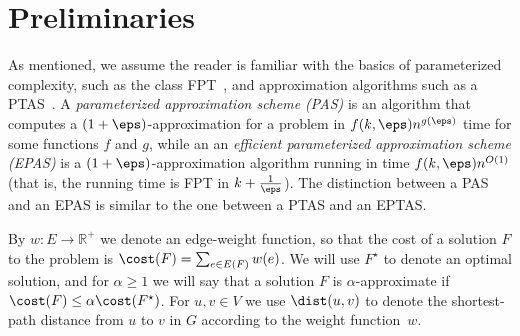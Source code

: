 \section{Preliminaries}\label{sec:prelims}

As mentioned, we assume the reader is familiar with the basics of parameterized
complexity, such as the class FPT~\cite{cygan2015parameterized}, and approximation algorithms
such as a PTAS~\cite{williamson2011design}. A
\emph{parameterized approximation scheme (PAS)} is an algorithm that computes a
$(1+\eps)$-approximation for a problem in  $f(k,\eps)n^{g(\eps)}$ time for some
functions $f$ and $g$, while an an \emph{efficient parameterized approximation
scheme (EPAS)} is a $(1+\eps)$-approximation algorithm running in time
$f(k,\eps)n^{O(1)}$ (that is, the running time is FPT in $k+\frac{1}{\eps}$).
The distinction between a PAS and an EPAS is similar to the one between a PTAS
and an EPTAS.

By $w:E\to\mathbb{R}^+$ we denote an edge-weight function, so that the cost of a solution $F$
to the \SF problem is $\cost(F)=\sum_{e\in E(F)} w(e)$. 
We will use $F^\star$ to denote an optimal solution, and for
$\alpha\ge 1$ we will say that a solution $F$ is $\alpha$-approximate if
$\cost(F)\le \alpha\cost(F^\star)$. For $u,v\in V$ we use $\dist(u,v)$ to
denote the shortest-path distance from $u$ to $v$ in $G$ according to the weight function~$w$.

